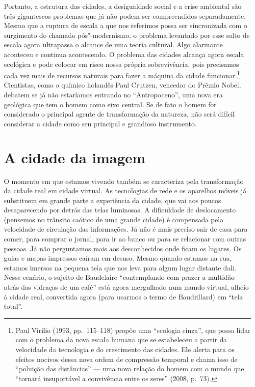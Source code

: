 Portanto, a estrutura das cidades, a desigualdade social e a crise ambiental são três gigantescos problemas que já não podem ser compreendidos separadamente. Mesmo que a ruptura de escala a que nos referimos possa ser
sincronizada com o surgimento do chamado pós"-modernismo, o problema
levantado por esse salto de escala agora ultrapassa o alcance de uma
teoria cultural. Algo alarmante aconteceu e continua acontecendo. O
problema das cidades alcança agora escala ecológica e pode colocar em
risco nossa própria sobrevivência, pois precisamos cada vez mais de
recursos naturais para fazer a máquina da cidade funcionar.\footnote{Paul
  Virilio (1993, pp.~115--118) propõe uma ``ecologia cinza'', que possa
  lidar com o problema da nova escala humana que se estabeleceu a partir
  da velocidade da tecnologia e do crescimento das cidades. Ele alerta
  para os efeitos nocivos dessa nova ordem de compressão temporal e
  chama isso de ``poluição das distâncias'' --- uma nova relação do homem
  com o mundo que ``tornará insuportável a convivência entre os seres''
  (2008, p.~73).} Cientistas, como o químico holandês Paul Crutzen,
vencedor do Prêmio Nobel, debatem se já não estaríamos entrando no
``Antropoceno'', uma nova era geológica que tem o homem como eixo
central. Se de fato o homem for considerado o principal agente de
transformação da natureza, não será difícil considerar a cidade como seu
principal e grandioso instrumento.

\chapter{A cidade da imagem}

O momento em que estamos vivendo também se caracteriza pela
transformação da cidade real em cidade virtual. As tecnologias de rede e
os aparelhos móveis já substituem em grande parte a experiência da
cidade, que vai aos poucos desaparecendo por detrás das telas luminosas.
A dificuldade de deslocamento (pensemos no trânsito caótico de uma
grande cidade) é compensada pela velocidade de circulação das
informações. Já não é mais preciso sair de casa para comer, para comprar
o jornal, para ir ao banco ou para se relacionar com outras pessoas. Já
não perguntamos mais aos desconhecidos onde ficam os lugares. Os guias e
mapas impressos caíram em desuso. Mesmo quando estamos na rua, estamos
imersos na pequena tela que nos leva para algum lugar distante dali.
Nesse cenário, o sujeito de Baudelaire ``contemplando com prazer a
multidão atrás das vidraças de um café'' está agora mergulhado num mundo virtual, alheio à cidade real, convertida agora (para usarmos o termo de Baudrillard) em ``tela total''.

